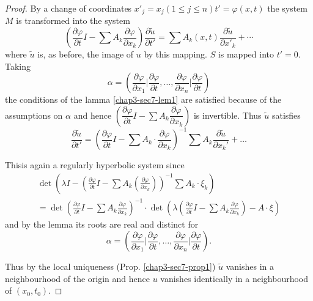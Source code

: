 \begin{proof}
By a change of coordinates  $x'_j = x_j (1 \leq j \leq n)t' = \varphi
(x, t)$ the system $M$ is transformed into the system 
\begin{equation}
\left(\frac{\partial \varphi}{\partial t}I - \sum A_k \frac{\partial
    \varphi}{ \partial x_k}\right) \frac{\partial \tilde{u}}{\partial t'}=
  \sum A_k (x,t) \frac{\partial \tilde{u}}{\partial x'_k}+ \cdots
  \tag{7.9} \label{chap3-eq7.9}
\end{equation}
where $\tilde{u}$ is, as before, the image of $u$ by this mapping. $S$
is mapped into $t' = 0$. Taking 
$$
\alpha =\left(\frac{\partial \varphi}{\partial x_1}\Bigg| \frac{
  \partial \varphi}{\partial t}, \ldots , \frac{\partial
  \varphi}{\partial x_n} \Bigg| \frac{ \partial \varphi}{\partial
  t}\right) 
$$
the conditions of the lamma \ref{chap3-sec7-lem1} are satisfied
because of the assumptions 
on $\alpha$ and hence $\left(\dfrac{\partial \varphi}{ \partial t} I-  \sum
A_k \dfrac{\partial \varphi} {\partial x_k}\right)$ is invertible. Thus
$\tilde{u}$ satisfies  
\begin{equation}
\frac{\partial \tilde{u}}{\partial t'}= \left(\frac{\partial \varphi}{
  \partial t} I - \sum A_k \cdot \frac{\partial \varphi}{\partial
  x_k}\right)^{-1} \sum A_k \frac{\partial \tilde{u}}{\partial x_k'} +
\ldots \tag{7.10} \label{chap3-eq7.10}
\end{equation}

 This\pageoriginale is again a regularly hyperbolic system since
 \begin{gather*}
 \det \left(\lambda I - \left(\frac{ \partial \varphi}{\partial t} I - \sum A_k
 (\frac{ \partial \varphi}{ \partial x_k})\right)^{-1} \sum A_k \cdot
 \xi_k \right) \\  
 = \det \left(\frac{\partial \varphi}{\partial t}I- \sum A_k \frac{
   \partial \varphi }{\partial x_k}\right)^{-1} \cdot \det
 \left(\lambda\left(\frac{\partial \varphi}{\partial t} I- \sum A_k
 \frac{\partial\varphi}{\partial x_k}\right)-A \cdot \xi \right)  
 \end{gather*} 
 and by the lemma its roots are real and distinct for
  $$
\alpha = (\dfrac{ \partial \varphi}{\partial x_1}\Bigg| \dfrac{
   \partial \varphi}{\partial t}, \ldots, \dfrac{ \partial
   \varphi}{\partial x_n} \Bigg| \dfrac{ \partial \varphi}{ \partial
   t}). 
$$

Thus by the local uniqueness (Prop. \ref{chap3-sec7-prop1})
$\tilde{u}$ vanishes in 
 a neighbourhood of the origin and hence $u$ vanishes identically in a
 neighbourhood of $(x_0, t_0)$. 
\end{proof}

